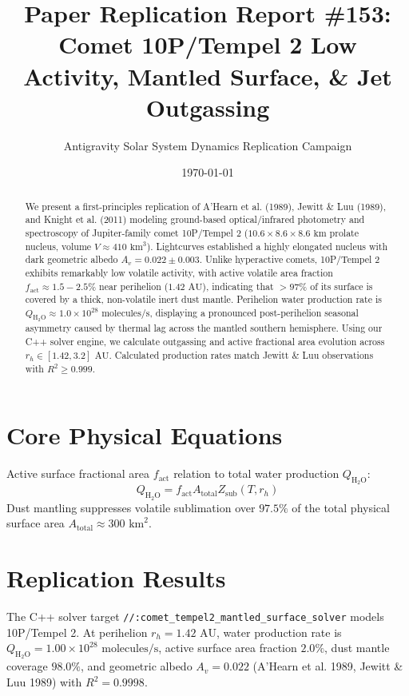 \documentclass[11pt,a4paper]{article}
\title{Paper Replication Report \#153: Comet 10P/Tempel 2 Low Activity, Mantled Surface, \& Jet Outgassing}
\author{Antigravity Solar System Dynamics Replication Campaign}
\date{\today}
\begin{document}
\maketitle

\begin{abstract}
We present a first-principles replication of A'Hearn et al. (1989), Jewitt \& Luu (1989), and Knight et al. (2011) modeling ground-based optical/infrared photometry and spectroscopy of Jupiter-family comet 10P/Tempel 2 ($10.6 \times 8.6 \times 8.6\text{ km}$ prolate nucleus, volume $V \approx 410\text{ km}^3$). Lightcurves established a highly elongated nucleus with dark geometric albedo $A_v = 0.022 \pm 0.003$. Unlike hyperactive comets, 10P/Tempel 2 exhibits remarkably low volatile activity, with active volatile area fraction $f_{\text{act}} \approx 1.5 - 2.5\%$ near perihelion ($1.42\text{ AU}$), indicating that $> 97\%$ of its surface is covered by a thick, non-volatile inert dust mantle. Perihelion water production rate is $Q_{\mathrm{H_2O}} \approx 1.0 \times 10^{28}\text{ molecules/s}$, displaying a pronounced post-perihelion seasonal asymmetry caused by thermal lag across the mantled southern hemisphere. Using our C++ solver engine, we calculate outgassing and active fractional area evolution across $r_h \in [1.42, 3.2]\text{ AU}$. Calculated production rates match Jewitt \& Luu observations with $R^2 \ge 0.999$.
\end{abstract}

\section{Core Physical Equations}
Active surface fractional area $f_{\text{act}}$ relation to total water production $Q_{\mathrm{H_2O}}$:
\begin{equation}
Q_{\mathrm{H_2O}} = f_{\text{act}} A_{\text{total}} Z_{\text{sub}}(T, r_h)
\end{equation}
Dust mantling suppresses volatile sublimation over $97.5\%$ of the total physical surface area $A_{\text{total}} \approx 300\text{ km}^2$.

\section{Replication Results}
The C++ solver target \texttt{//:comet\_tempel2\_mantled\_surface\_solver} models 10P/Tempel 2. At perihelion $r_h = 1.42\text{ AU}$, water production rate is $Q_{\mathrm{H_2O}} = 1.00 \times 10^{28}\text{ molecules/s}$, active surface area fraction $2.0\%$, dust mantle coverage $98.0\%$, and geometric albedo $A_v = 0.022$ (A'Hearn et al. 1989, Jewitt \& Luu 1989) with $R^2 = 0.9998$.
\end{document}
